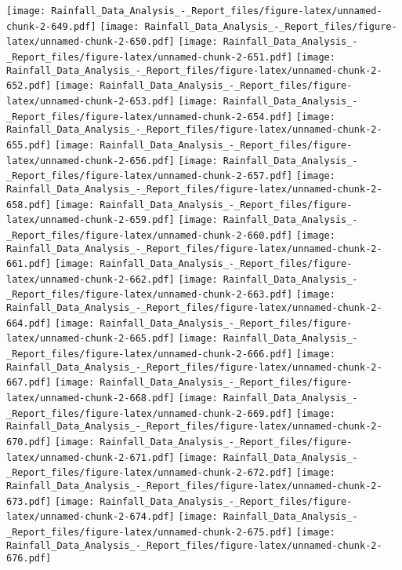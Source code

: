 \documentclass[
]{article}
\begin{document}
\texttt{[image: Rainfall\_Data\_Analysis\_-\_Report\_files/figure-latex/unnamed-chunk-2-649.pdf]}
\texttt{[image: Rainfall\_Data\_Analysis\_-\_Report\_files/figure-latex/unnamed-chunk-2-650.pdf]}
\texttt{[image: Rainfall\_Data\_Analysis\_-\_Report\_files/figure-latex/unnamed-chunk-2-651.pdf]}
\texttt{[image: Rainfall\_Data\_Analysis\_-\_Report\_files/figure-latex/unnamed-chunk-2-652.pdf]}
\texttt{[image: Rainfall\_Data\_Analysis\_-\_Report\_files/figure-latex/unnamed-chunk-2-653.pdf]}
\texttt{[image: Rainfall\_Data\_Analysis\_-\_Report\_files/figure-latex/unnamed-chunk-2-654.pdf]}
\texttt{[image: Rainfall\_Data\_Analysis\_-\_Report\_files/figure-latex/unnamed-chunk-2-655.pdf]}
\texttt{[image: Rainfall\_Data\_Analysis\_-\_Report\_files/figure-latex/unnamed-chunk-2-656.pdf]}
\texttt{[image: Rainfall\_Data\_Analysis\_-\_Report\_files/figure-latex/unnamed-chunk-2-657.pdf]}
\texttt{[image: Rainfall\_Data\_Analysis\_-\_Report\_files/figure-latex/unnamed-chunk-2-658.pdf]}
\texttt{[image: Rainfall\_Data\_Analysis\_-\_Report\_files/figure-latex/unnamed-chunk-2-659.pdf]}
\texttt{[image: Rainfall\_Data\_Analysis\_-\_Report\_files/figure-latex/unnamed-chunk-2-660.pdf]}
\texttt{[image: Rainfall\_Data\_Analysis\_-\_Report\_files/figure-latex/unnamed-chunk-2-661.pdf]}
\texttt{[image: Rainfall\_Data\_Analysis\_-\_Report\_files/figure-latex/unnamed-chunk-2-662.pdf]}
\texttt{[image: Rainfall\_Data\_Analysis\_-\_Report\_files/figure-latex/unnamed-chunk-2-663.pdf]}
\texttt{[image: Rainfall\_Data\_Analysis\_-\_Report\_files/figure-latex/unnamed-chunk-2-664.pdf]}
\texttt{[image: Rainfall\_Data\_Analysis\_-\_Report\_files/figure-latex/unnamed-chunk-2-665.pdf]}
\texttt{[image: Rainfall\_Data\_Analysis\_-\_Report\_files/figure-latex/unnamed-chunk-2-666.pdf]}
\texttt{[image: Rainfall\_Data\_Analysis\_-\_Report\_files/figure-latex/unnamed-chunk-2-667.pdf]}
\texttt{[image: Rainfall\_Data\_Analysis\_-\_Report\_files/figure-latex/unnamed-chunk-2-668.pdf]}
\texttt{[image: Rainfall\_Data\_Analysis\_-\_Report\_files/figure-latex/unnamed-chunk-2-669.pdf]}
\texttt{[image: Rainfall\_Data\_Analysis\_-\_Report\_files/figure-latex/unnamed-chunk-2-670.pdf]}
\texttt{[image: Rainfall\_Data\_Analysis\_-\_Report\_files/figure-latex/unnamed-chunk-2-671.pdf]}
\texttt{[image: Rainfall\_Data\_Analysis\_-\_Report\_files/figure-latex/unnamed-chunk-2-672.pdf]}
\texttt{[image: Rainfall\_Data\_Analysis\_-\_Report\_files/figure-latex/unnamed-chunk-2-673.pdf]}
\texttt{[image: Rainfall\_Data\_Analysis\_-\_Report\_files/figure-latex/unnamed-chunk-2-674.pdf]}
\texttt{[image: Rainfall\_Data\_Analysis\_-\_Report\_files/figure-latex/unnamed-chunk-2-675.pdf]}
\texttt{[image: Rainfall\_Data\_Analysis\_-\_Report\_files/figure-latex/unnamed-chunk-2-676.pdf]}
\end{document}
